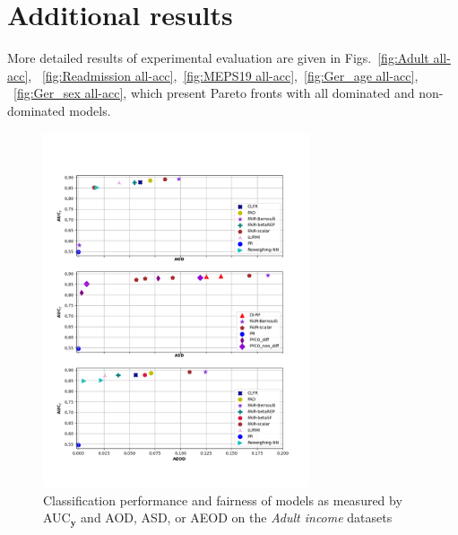 \documentclass[preprint,12pt]{elsarticle}
\begin{document}
\section{Additional results}
\label{app:Additional_results}

More detailed results of experimental evaluation are given in Figs.~\ref{fig:Adult all-acc}, ~\ref{fig:Readmission all-acc},~\ref{fig:MEPS19 all-acc},~\ref{fig:Ger_age all-acc}, ~\ref{fig:Ger_sex all-acc}, which present Pareto fronts with all dominated and non-dominated models.

\iffalse
\begin{figure}
	\center
	\includegraphics[angle=0, width=0.7\textwidth]{Adult.png}
	\captionsetup{justification=centering}
	\caption{Classification performance and fairness of models as measured by AUC$_\mathbf{y}$ and AOD, ASD, or AEOD on the \textit{Adult income} datasets}
	\label{fig:Adult1}
	\vskip -0.2in
\end{figure}
\end{document}
